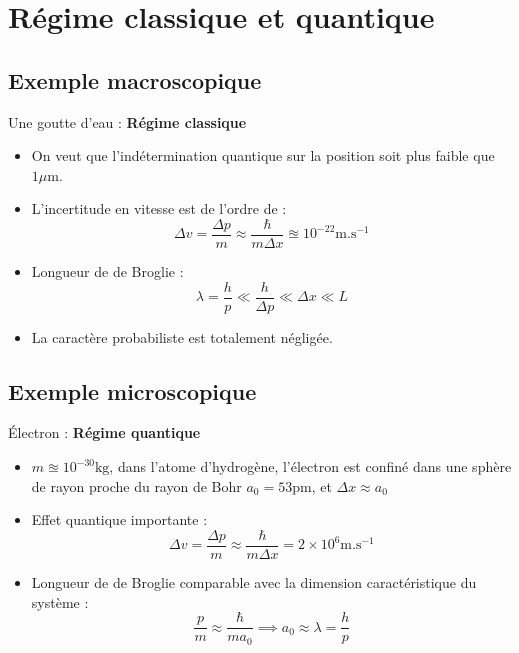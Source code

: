 \section{Régime classique et quantique} %


\subsection{Exemple macroscopique} %

Une goutte d'eau : \textbf{Régime classique}
\begin{itemize}

    \item On veut que l'indétermination quantique sur la position soit plus faible que $1 \mu\mathrm{m}$. 
    \item L'incertitude en vitesse est de l'ordre de :
      \begin{equation}
        \Delta v = \frac{\Delta p}{ m}  \approx \frac{\hbar}{m \Delta x}  \approxeq 10 ^{-22} \mathrm{m}. \mathrm{s} ^{-1}
      \end{equation}
    \item Longueur de de Broglie : 
      \begin{equation}
        \lambda = \frac{h}{p}  \ll  \frac{h}{\Delta p} \ll \Delta x \ll L
      \end{equation}
    \item La caractère probabiliste est totalement négligée.

\end{itemize}

\subsection{Exemple microscopique} %
\label{sub:Exemple microscopique}


Électron : \textbf{Régime quantique}
\begin{itemize}

    \item $m \approxeq 10 ^{-30} \mathrm{kg}$, dans l'atome d'hydrogène, l'électron est confiné dans une sphère de rayon proche du rayon de Bohr $a_0 = 53 \mathrm{pm}$, et $\Delta x \approx a_0$

    \item Effet quantique importante : 
      \begin{equation}
        \Delta v = \frac{\Delta p}{m}  \approx \frac{\hbar}{m \Delta x}  = 2 \times 10 ^{6} \mathrm{m}. \mathrm{s} ^{-1}
      \end{equation}

    \item Longueur de de Broglie comparable avec la dimension caractéristique du système : 
      \begin{equation}
        \frac{p}{m}  \approx \frac{\hbar}{m a_0}  \implies a_0 \approx \lambda = \frac{h}{p} 
      \end{equation}



\end{itemize}

